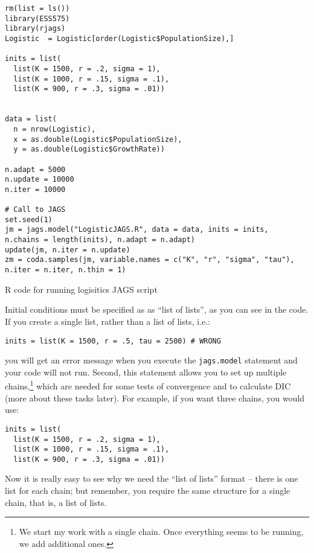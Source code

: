 \documentclass[12pt,english]{article}
\begin{document}
\begin{algorithm}
\begin{Verbatim}[frame=single]
rm(list = ls())
library(ESS575)
library(rjags)
Logistic  = Logistic[order(Logistic$PopulationSize),]

inits = list(
  list(K = 1500, r = .2, sigma = 1),
  list(K = 1000, r = .15, sigma = .1),
  list(K = 900, r = .3, sigma = .01))


data = list(
  n = nrow(Logistic),
  x = as.double(Logistic$PopulationSize),
  y = as.double(Logistic$GrowthRate))

n.adapt = 5000
n.update = 10000
n.iter = 10000

# Call to JAGS
set.seed(1)
jm = jags.model("LogisticJAGS.R", data = data, inits = inits, 
n.chains = length(inits), n.adapt = n.adapt)
update(jm, n.iter = n.update)
zm = coda.samples(jm, variable.names = c("K", "r", "sigma", "tau"),
n.iter = n.iter, n.thin = 1)
\end{Verbatim}
\caption{R code for running logisitics JAGS script}
\label{alg:R-code-for}
\end{algorithm}

Initial conditions must be specified as as \enquote{list of lists}, as you can see in the code. If you create a single list, rather than a list of lists, i.e.:

\begin{Verbatim}
inits = list(K = 1500, r = .5, tau = 2500) # WRONG
\end{Verbatim}

\noindent you will get an error message when you execute the \texttt{jags.model} statement and your code will not run. Second, this statement allows you to set up multiple chains,\footnote{We start my work with a single chain. Once everything seems to be running, we add additional ones.} which are needed for some tests of convergence and to calculate DIC (more about these tasks later). For example, if you want three chains, you would use:

\begin{Verbatim}
inits = list(
  list(K = 1500, r = .2, sigma = 1),
  list(K = 1000, r = .15, sigma = .1),
  list(K = 900, r = .3, sigma = .01))
\end{Verbatim}

\noindent Now it is really easy to see why we need the \enquote{list of lists} format -- there is one list for each chain; but remember, you require the same structure for a single chain, that is, a list of lists.
\end{document}
